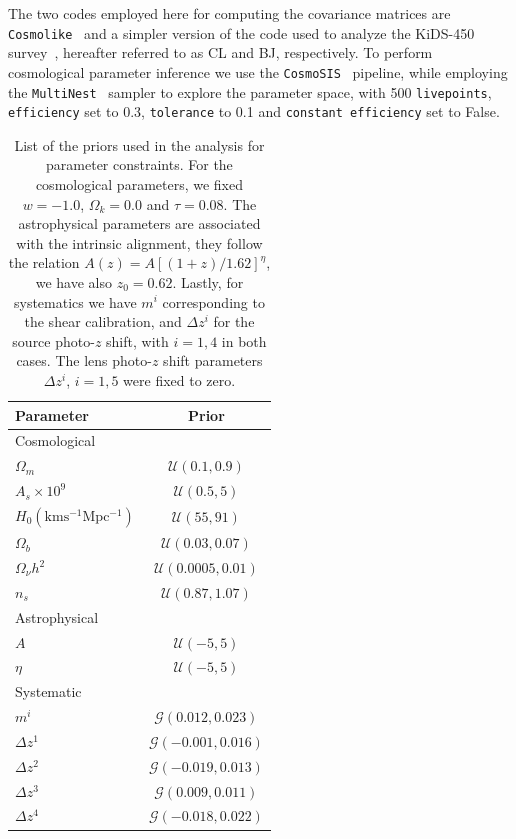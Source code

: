 \documentclass[twocolumn]{\docclass}
\begin{document}
The two codes employed here for computing the covariance matrices are {\tt Cosmolike}~\citep{Krause:2016jvl} and a simpler version of the code used to analyze the KiDS-450 survey~\citep{Kohlinger:2017sxk}, hereafter referred to as CL and BJ, respectively. To perform cosmological parameter inference we use the {\tt CosmoSIS}~\citep{ZUNTZ201545} pipeline, while employing the {\tt MultiNest}~\citep{nested:feroz09} sampler to explore the parameter space, with 500 {\tt livepoints}, {\tt efficiency} set to 0.3, {\tt tolerance} to 0.1 and {\tt constant efficiency} set to False.

\begin{table}
\centering
\begin{tabular} { l c} 
\hline
\hline
Parameter							& Prior	\\ \hline
Cosmological & \\ [1ex]
$\Omega_m$						& $\mathcal{U}(0.1, 0.9)$		\\
$A_s \times 10^9$					& $\mathcal{U}(0.5, 5)$		\\
$H_0 \mathrm{(km s^{-1} Mpc^{-1})}$	& $\mathcal{U}(55, 91)$		\\
$\Omega_b$						& $\mathcal{U}(0.03, 0.07)$	\\
$\Omega_\nu h^2$					& $\mathcal{U}(0.0005, 0.01)$	\\
$n_s$							& $\mathcal{U}(0.87, 1.07)$	\\ [1ex]
\hline
Astrophysical & \\ [1ex]
$A$								& $\mathcal{U}(-5, 5)$ \\
$\eta$							& $\mathcal{U}(-5, 5)$ \\ [1ex]
\hline
Systematic & \\ [1ex]
$m^i$							& $\mathcal{G}(0.012, 0.023)$	 \\
$\Delta z^1$						& $\mathcal{G}(-0.001, 0.016)$	 \\
$\Delta z^2$						& $\mathcal{G}(-0.019, 0.013)$	 \\
$\Delta z^3$						& $\mathcal{G}(0.009, 0.011)$	 \\
$\Delta z^4$						& $\mathcal{G}(-0.018, 0.022)$	 \\ [1ex]
\hline
\hline
\end{tabular}
\caption{List of the priors used in the analysis for parameter constraints. For the cosmological parameters, we fixed $w = -1.0$, $\Omega_k =  0.0$ and $\tau =  0.08$. The astrophysical parameters are associated with the intrinsic alignment, they follow the relation $A(z) = A[(1+z)/1.62]^{\eta}$, we have also $z_0 = 0.62$. Lastly, for systematics we have $m^i$ corresponding to the shear calibration, and  $\Delta z^i$ for the source photo-$z$ shift, with $i = 1, 4$ in both cases. The lens photo-$z$ shift parameters $\Delta z^i$, $i = 1, 5$ were fixed to zero.}
\label{tab:constraints}
\end{table}
\end{document}
